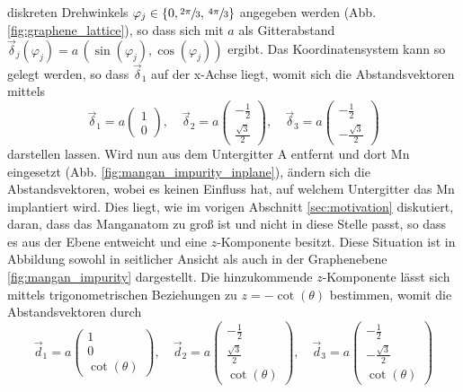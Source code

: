 diskreten Drehwinkels $\varphi_j \in \{ 0,  \sfrac{2\pi}{3}, \, \sfrac{4\pi}{3} \} $ angegeben werden (Abb. \ref{fig:graphene_lattice}), so dass sich mit $a$ als Gitterabstand
$\vec{\delta}_j(\varphi_j) = a \, ( \sin (\varphi_j), \cos (\varphi_j) )$
ergibt.
Das Koordinatensystem kann so gelegt werden, so dass $\vec{\delta}_1$ auf der x-Achse liegt, womit sich die Abstandsvektoren mittels
\begin{equation*}
    \vec{\delta}_1 = a \begin{pmatrix} 1            \\[4pt] 0                   \end{pmatrix}, \quad
    \vec{\delta}_2 = a \begin{pmatrix} -\frac{1}{2} \\[4pt] \frac{\sqrt{3}}{2}  \end{pmatrix}, \quad 
    \vec{\delta}_3 = a \begin{pmatrix} -\frac{1}{2} \\[4pt] -\frac{\sqrt{3}}{2} \end{pmatrix}
\end{equation*}
darstellen lassen.
Wird nun aus dem Untergitter A entfernt und dort Mn eingesetzt (Abb. \ref{fig:mangan_impurity_inplane}), 
ändern sich die Abstandsvektoren, wobei es keinen Einfluss hat, auf welchem Untergitter das Mn implantiert wird.
Dies liegt, wie im vorigen Abschnitt \ref{sec:motivation} diskutiert, daran, dass das Manganatom zu groß ist und nicht in diese Stelle passt, so dass es aus der Ebene entweicht und 
eine $z$-Komponente besitzt.
Diese Situation ist in Abbildung sowohl in seitlicher Ansicht als auch in der Graphenebene  \ref{fig:mangan_impurity} dargestellt.
Die hinzukommende $z$-Komponente lässt sich mittels trigonometrischen Beziehungen zu $z = -\cot (\theta)$ bestimmen, womit die 
Abstandsvektoren durch 
\begin{equation*}
    \vec{d}_1 = a \begin{pmatrix} 1            \\[4pt] 0                   \\[4pt] \cot (\theta)\end{pmatrix}, \quad
    \vec{d}_2 = a \begin{pmatrix} -\frac{1}{2} \\[4pt] \frac{\sqrt{3}}{2}  \\[4pt] \cot (\theta)\end{pmatrix}, \quad 
    \vec{d}_3 = a \begin{pmatrix} -\frac{1}{2} \\[4pt] -\frac{\sqrt{3}}{2} \\[4pt] \cot (\theta)\end{pmatrix}
\end{equation*}
